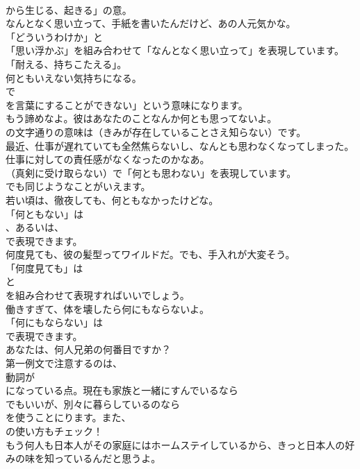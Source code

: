 \documentclass[8pt]{extreport}
\begin{document}
\begin{CJK}{UTF8}{min}
\\	から生じる、起きる」の意。	
\\	なんとなく思い立って、手紙を書いたんだけど、あの人元気かな。 
\\	「どういうわけか」と
\\	「思い浮かぶ」を組み合わせて「なんとなく思い立って」を表現しています。
\\	「耐える、持ちこたえる」。	
\\	何ともいえない気持ちになる。 
\\	で
\\	を言葉にすることができない」という意味になります。	
\\	もう諦めなよ。彼はあなたのことなんか何とも思ってないよ。 
\\	の文字通りの意味は（きみが存在していることさえ知らない）です。	
\\	最近、仕事が遅れていても全然焦らないし、なんとも思わなくなってしまった。仕事に対しての責任感がなくなったのかなあ。 
\\	（真剣に受け取らない）で「何とも思わない」を表現しています。
\\	でも同じようなことがいえます。	
\\	若い頃は、徹夜しても、何ともなかったけどな。 
\\	「何ともない」は
\\	、あるいは、
\\	で表現できます。	
\\	何度見ても、彼の髪型ってワイルドだ。でも、手入れが大変そう。 
\\	「何度見ても」は 
\\	と 
\\	を組み合わせて表現すればいいでしょう。	
\\	働きすぎて、体を壊したら何にもならないよ。 
\\	「何にもならない」は 
\\	で表現できます。	
\\	あなたは、何人兄弟の何番目ですか？ 
\\	第一例文で注意するのは、
\\	動詞が
\\	になっている点。現在も家族と一緒にすんでいるなら
\\	でもいいが、別々に暮らしているのなら
\\	を使うことにります。また、
\\	の使い方もチェック！	
\\	もう何人も日本人がその家庭にはホームステイしているから、きっと日本人の好みの味を知っているんだと思うよ。 

\end{CJK}
\end{document}
